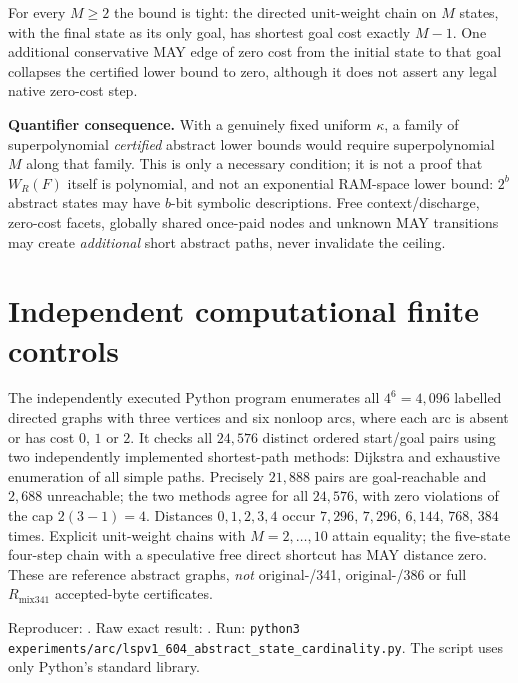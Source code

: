 \documentclass[11pt]{article}
\begin{document}
For every $M\geq2$ the bound is tight: the directed unit-weight chain on $M$ states, with the final state as its only goal, has shortest goal cost exactly $M-1$. One additional conservative MAY edge of zero cost from the initial state to that goal collapses the certified lower bound to zero, although it does not assert any legal native zero-cost step.

\textbf{Quantifier consequence.} With a genuinely fixed uniform $\kappa$, a family of superpolynomial \emph{certified} abstract lower bounds would require superpolynomial $M$ along that family. This is only a necessary condition; it is not a proof that $W_R(F)$ itself is polynomial, and not an exponential RAM-space lower bound: $2^b$ abstract states may have $b$-bit symbolic descriptions. Free context/discharge, zero-cost facets, globally shared once-paid nodes and unknown MAY transitions may create \emph{additional} short abstract paths, never invalidate the ceiling.

\section*{Independent computational finite controls}
The independently executed Python program enumerates all $4^6=4,096$ labelled directed graphs with three vertices and six nonloop arcs, where each arc is absent or has cost $0$, $1$ or $2$. It checks all $24,576$ distinct ordered start/goal pairs using two independently implemented shortest-path methods: Dijkstra and exhaustive enumeration of all simple paths. Precisely $21,888$ pairs are goal-reachable and $2,688$ unreachable; the two methods agree for all $24,576$, with zero violations of the cap $2(3-1)=4$. Distances $0,1,2,3,4$ occur $7,296$, $7,296$, $6,144$, $768$, $384$ times. Explicit unit-weight chains with $M=2,\ldots,10$ attain equality; the five-state four-step chain with a speculative free direct shortcut has MAY distance zero. These are reference abstract graphs, \emph{not} original-/341, original-/386 or full $R_{\mathrm{mix341}}$ accepted-byte certificates.

Reproducer:
.
Raw exact result:
.
Run: \texttt{python3 experiments/arc/lspv1\_604\_abstract\_state\_cardinality.py}.
The script uses only Python's standard library.
\end{document}
